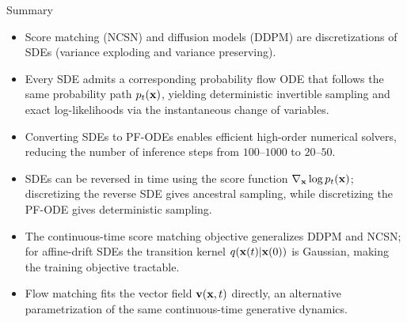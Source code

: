 \documentclass{beamer}
\begin{document}
\begin{frame}{Summary}
	\begin{itemize}
		\item Score matching (NCSN) and diffusion models (DDPM) are discretizations of SDEs (variance exploding and variance preserving).
		\vfill
		\item Every SDE admits a corresponding probability flow ODE that follows the same probability path $p_t(\mathbf{x})$, yielding deterministic invertible sampling and exact log-likelihoods via the instantaneous change of variables.
		\vfill
		\item Converting SDEs to PF-ODEs enables efficient high-order numerical solvers, reducing the number of inference steps from $100$--$1000$ to $20$--$50$.
		\vfill
		\item SDEs can be reversed in time using the score function $\nabla_{\mathbf{x}} \log p_t(\mathbf{x})$; discretizing the reverse SDE gives ancestral sampling, while discretizing the PF-ODE gives deterministic sampling.
		\vfill
		\item The continuous-time score matching objective generalizes DDPM and NCSN; for affine-drift SDEs the transition kernel $q(\mathbf{x}(t) | \mathbf{x}(0))$ is Gaussian, making the training objective tractable.
		\vfill
		\item Flow matching fits the vector field $\mathbf{v}(\mathbf{x}, t)$ directly, an alternative parametrization of the same continuous-time generative dynamics.
	\end{itemize}
\end{frame}
\end{document}

